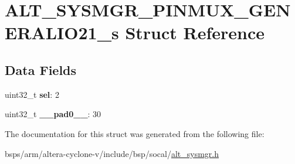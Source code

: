 \hypertarget{structALT__SYSMGR__PINMUX__GENERALIO21__s}{}\section{A\+L\+T\+\_\+\+S\+Y\+S\+M\+G\+R\+\_\+\+P\+I\+N\+M\+U\+X\+\_\+\+G\+E\+N\+E\+R\+A\+L\+I\+O21\+\_\+s Struct Reference}
\label{structALT__SYSMGR__PINMUX__GENERALIO21__s}
\subsection*{Data Fields}
\begin{DoxyCompactItemize}
\item 
\mbox{\label{structALT__SYSMGR__PINMUX__GENERALIO21__s_a76a17d8c5e872b323b643ea8f36e0dce}} 
uint32\+\_\+t {\bfseries sel}\+: 2
\item 
\mbox{\label{structALT__SYSMGR__PINMUX__GENERALIO21__s_ad8164e917c8c3f0a8c1bacccaf2f5acf}} 
uint32\+\_\+t {\bfseries \+\_\+\+\_\+pad0\+\_\+\+\_\+}\+: 30
\end{DoxyCompactItemize}


The documentation for this struct was generated from the following file\+:\begin{DoxyCompactItemize}
\item 
bsps/arm/altera-\/cyclone-\/v/include/bsp/socal/\mbox{\hyperlink{alt__sysmgr_8h}{alt\+\_\+sysmgr.\+h}}\end{DoxyCompactItemize}
